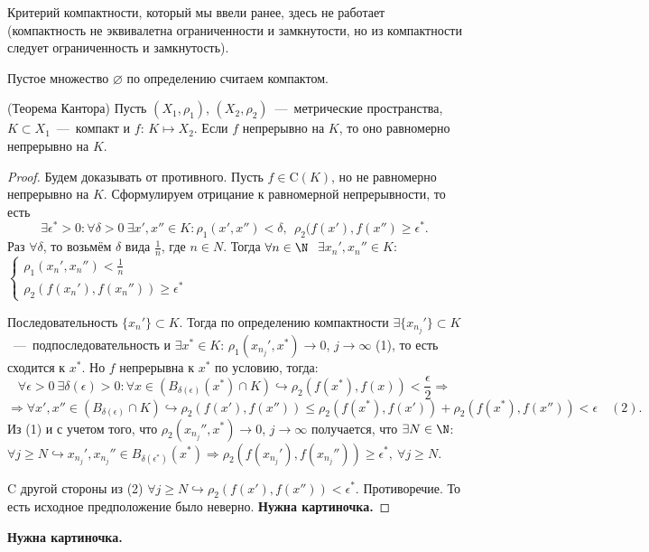 \begin{note}
    Критерий компактности, который мы ввели ранее, здесь не работает (компактность не эквивалетна ограниченности и замкнутости, но из компактности следует ограниченность и замкнутость).
\end{note}
\begin{definition}
    Пустое множество $\varnothing$ по определению считаем компактом.
\end{definition}
\begin{theorem}
    (Теорема Кантора) Пусть $(X_1, \rho_1)$, $(X_2, \rho_2)$~---~метрические пространства, $K \subset X_1$~---~компакт и $f$: $K \mapsto X_2$. Если $f$ непрерывно на $K$, то оно равномерно непрерывно на $K$.
\end{theorem}
\begin{proof}
    Будем доказывать от противного. Пусть $f \in \text{C}\left(K\right)$, но не равномерно непрерывно на $K$. Сформулируем отрицание к равномерной непрерывности, то есть
    $$ \exists \epsilon^{*} > 0: \forall \delta > 0 \  \exists x', x'' \in K: \rho_{1}(x', x'') < \delta, \ \  \rho_{2}(f(x'), f(x'') \geq \epsilon^{*}.$$
    Раз $\forall \delta$, то возьмём $\delta$ вида $\frac{1}{n}$, где $n \in N$. Тогда $\forall n \in \N\ $ $\exists x_{n}', x_{n}'' \in K$:  $\begin{cases}
    \rho_1 (x_{n}', x_{n}'') < \frac{1}{n} \\
    \rho_2 (f(x_{n}'), f(x_{n}'')) \geq \epsilon^{*}
    \end{cases}$

    Последовательность $\{ x_{n}' \} \subset K$. Тогда по определению компактности $\exists \{ x_{n_{j}}' \} \subset K$~---~подпоследовательность и $\exists x^{*} \in K$: $\rho_{1}({x_{n_{j}}}', x^{*})\to 0$, $j\to \infty$ (1), то есть сходится к $x^{*}$. Но $f$ непрерывна к $x^{*}$ по условию, тогда:
    $$ \forall \epsilon > 0 \  \exists \delta (\epsilon) > 0: \forall x \in \left(B_{\delta (\epsilon)} (x^{*}) \cap K\right) \hookrightarrow \rho_{2}(f(x^{*}), f(x)) < \frac{\epsilon}{2} \Rightarrow$$
    $$\Rightarrow \forall x', x'' \in \left(B_{\delta (\epsilon)} \cap K \right) \hookrightarrow \rho_{2}(f(x'), f(x'')) \leq \rho_{2}(f(x^{*}), f(x')) + \rho_{2}(f(x^{*}), f(x'')) < \epsilon \quad (2).$$
    Из (1) и с учетом того, что $\rho_{2}(x_{n_{j}}'', x^{*})\to 0$, $j\to \infty$ получается, что $\exists N \in \N$: $\forall j \geq N \hookrightarrow x_{n_{j}}', x_{n_{j}}'' \in B_{\delta (\epsilon^{*})} (x^{*}) \Rightarrow \rho_{2}(f(x_{n_{j}}'), f(x_{n_{j}}'')) \geq \epsilon^{*}, \  \forall j \geq N$.

    C другой стороны из (2) $\forall j \geq N \hookrightarrow \rho_{2}(f(x'), f(x'')) < \epsilon^{*}$. Противоречие. То есть исходное предположение было неверно.
    \textbf{Нужна картиночка.}
\end{proof}
\textbf{Нужна картиночка.}

